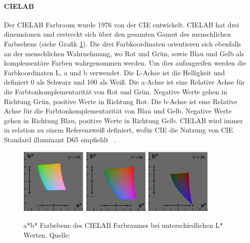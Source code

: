 \documentclass[12pt, a4paper, ngerman]{article}
\begin{document}
\paragraph{CIELAB}
Der CIELAB Farbraum wurde 1976 von der CIE entwickelt.
CIELAB hat drei dinemsionen und erstreckt sich über den gesamten Gamut des menschlichen Farbsehens (siehe Grafik \ref{fig:CIELAB}).
Die drei Farbkoordinaten orientieren sich ebenfalls an der menschlichen Wahrnehmung, 
wo Rot und Grün, sowie Blau und Gelb als komplementäre Farben wahrgenommen werden.
Um dies aufzugreifen werden die Farbkoordinaten L, a und b verwendet.
Die L-Achse ist die Helligkeit und definiert 0 als Schwarz und 100 als Weiß.
Die a-Achse ist eine Relative Achse für die Farbtonkomplementarität von Rot und Grün.
Negative Werte gehen in Richtung Grün, positive Werte in Richtung Rot.
Die b-Achse ist eine Relative Achse für die Farbtonkomplementarität von Blau und Gelb.
Negative Werte gehen in Richtung Blau, positive Werte in Richtung Gelb.
CIELAB wird immer in relation zu einem Referenzweiß definiert, 
wofür CIE die Nutzung von CIE Standard illuminant D65 empfiehlt ~\cite{CIELAB_color_space_2023}.

\begin{figure}
  \centering
  \includegraphics[width=0.29\textwidth]{Grafiken/CIELAB1.png}
  \includegraphics[width=0.29\textwidth]{Grafiken/CIELAB2.png}
  \includegraphics[width=0.29\textwidth]{Grafiken/CIELAB3.png}
  \caption{a*b* Farbebene des CIELAB Farbraumes bei unterschiedlichen L* Werten. Quelle: ~\cite{CIELAB_color_space_2023}}
  \label{fig:CIELAB}
\end{figure}
\end{document}
